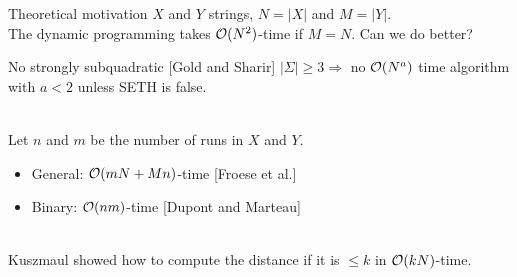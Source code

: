 \begin{frame}{Theoretical motivation}
    $X$ and $Y$ strings, $N=|X|$ and $M=|Y|$.\\
    The dynamic programming takes $\mathcal{O}(N^2)$-time if $M=N$. Can we do better?\pause
    \begin{block}{No strongly subquadratic [Gold and Sharir]}
    $|\Sigma| \geq 3 \Rightarrow $ no $\mathcal{O}(N^{a})$ time algorithm with $a<2$ unless SETH is false.
    \end{block}\pause
    
    \\
    Let $n$ and $m$ be the number of runs in $X$ and $Y$. \pause
    \begin{itemize}
    \item General: $\mathcal{O}(mN+Mn)$-time [Froese et al.] \pause
    \item Binary: $\mathcal{O}(nm)$-time [Dupont and Marteau] \pause
    \end{itemize} \hfill
    
    \\
    Kuszmaul showed how to compute the distance if it is $\leq k$ in $\mathcal{O}(kN)$-time.
    \end{frame}
    
    
    